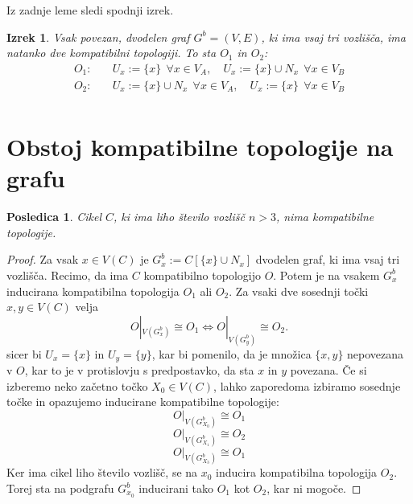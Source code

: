 \documentclass[a4paper, 12pt]{book}
\newtheorem{theorem}{Izrek}[section]
\newtheorem{corollary}{Posledica}[section]
\theoremstyle{definition}
\theoremstyle{remark}
\begin{document}
Iz zadnje leme sledi spodnji izrek.
\begin{theorem}
Vsak povezan, dvodelen graf $G^b = (V,E)$, ki ima vsaj tri vozlišča, ima natanko
dve kompatibilni topologiji. To sta $O_1$ in $O_2$:
\[
  \begin{split}
  O_1:&\quad
  U_x:=\{x\}\ \ \forall x \in V_A, \quad
  U_x:=\{x\}\cup N_x\ \  \forall x \in V_B\\
  O_2:&\quad
  U_x:=\{x\}\cup N_x\ \  \forall x \in V_A, \quad
  U_x:=\{x\}\ \ \forall x \in V_B\\
\end{split}
\]
\end{theorem}

\section{Obstoj kompatibilne topologije na grafu} \label{obstoj}

\begin{corollary}\label{corollary1}
Cikel $C$, ki ima liho število vozlišč $n > 3$, nima kompatibilne topologije.
\end{corollary}
\begin{proof}
Za vsak $x \in V(C)$ je $G_x^b := C[\{x\} \cup N_x]$ dvodelen graf, ki ima vsaj tri
vozlišča. Recimo, da ima $C$ kompatibilno topologijo $O$. Potem je na vsakem $G_x^b$ inducirana 
kompatibilna topologija $O_1$ ali $O_2$. Za vsaki dve sosednji točki $x,y \in V(C)$ velja
\[
  O|_{V(G_x^b)} \cong O_1 \iff O|_{V(G_y^b)} \cong O_2.
\]
sicer bi $U_x = \{x\}$ in $U_y = \{y\}$, kar bi pomenilo, da je množica
$\{x, y\}$ nepovezana v $O$, kar to je v protislovju s predpostavko, da sta $x$ in
$y$ povezana. Če si izberemo neko začetno točko $X_0 \in V(C)$, lahko zaporedoma
izbiramo sosednje točke in opazujemo inducirane kompatibilne topologije:
\[O|_{V(G_{X_0}^b)} \cong O_1\]
\[O|_{V(G_{X_1}^b)} \cong O_2\]
\[O|_{V(G_{X_3}^b)} \cong O_1\]
Ker ima cikel liho število vozlišč, se na $x_0$ inducira kompatibilna topologija $O_2$. Torej
sta na podgrafu $G^b_{x_0}$ inducirani tako $O_1$ kot $O_2$, kar ni mogoče.
\end{proof}
\end{document}
